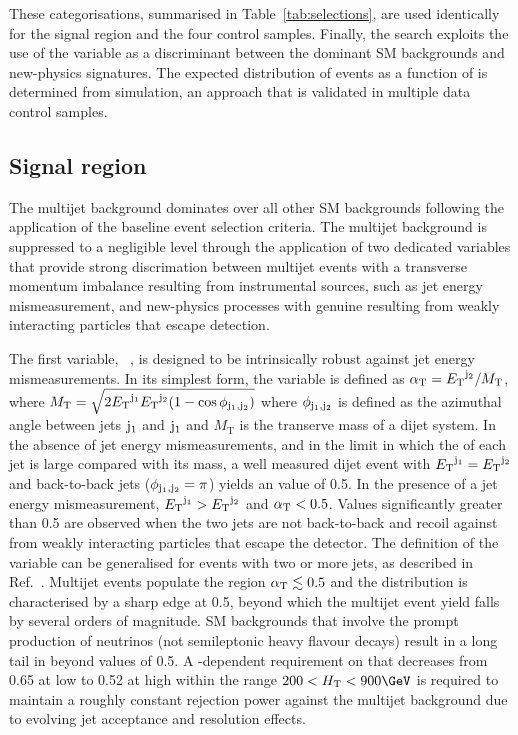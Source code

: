 These categorisations, summarised in
Table~\ref{tab:selections}, are used identically for the signal region
and the four control samples. Finally, the search exploits the use of
the \mht variable as a discriminant between the dominant SM
backgrounds and new-physics signatures. The expected distribution of
events as a function of \mht is determined from simulation, an
approach that is validated in multiple data control samples.

\subsection{Signal region}
\label{sec:signalregion}

The multijet background dominates over all other SM backgrounds
following the application of the baseline event selection
criteria. The multijet background is suppressed to a negligible level
through the application of two dedicated variables that provide strong
discrimation between multijet events with a transverse momentum
imbalance resulting from instrumental sources, such as jet energy
mismeasurement, and new-physics processes with genuine \ptvecmiss
resulting from weakly interacting particles that escape detection.

The first variable, \alphat~\cite{Randall:2008rw, RA1Paper}, is
designed to be intrinsically robust against jet energy
mismeasurements. In its simplest form, the \alphat variable is defined
as $\alpha_{\mathrm{T}} = {E_{\text T}}^{\rm j_2}/M_\text{T}$, where $M_\textrm{T} = \sqrt{
  2 {E_{\text T}}^{\rm j_1} {E_{\text T}}^{\rm j_2} (1 - \cos\phi_{\rm j_1,j_2})}$ where
$\phi_{\rm j_1,j_2}$ is defined as the azimuthal angle between jets
${\rm j_1}$ and ${\rm j_1}$ and $M_\textrm{T}$ is the transerve mass
of a dijet system. In the absence of jet energy mismeasurements, and
in the limit in which the \Et of each jet is large compared with its
mass, a well measured dijet event with ${E_{\text T}}^{\mathrm{j_1}} =
{E_{\text T}}^{\mathrm{j_2}}$ and back-to-back jets ($\phi_{\rm j_1,j_2} = \pi$)
yields an \alphat value of 0.5. In the presence of a jet energy
mismeasurement, ${E_{\text T}}^{\mathrm{j_1}} > {E_{\text T}}^{\mathrm{j_2}}$ and $\alpha_{\mathrm{T}}
< 0.5$. Values significantly greater than 0.5 are observed when the
two jets are not back-to-back and recoil against \ptvecmiss from
weakly interacting particles that escape the detector. The definition
of the \alphat variable can be generalised for events with two or more
jets, as described in Ref.~\cite{}. Multijet events populate the
region $\alpha_{\mathrm{T}} \lesssim 0.5$ and the \alphat distribution is
characterised by a sharp edge at 0.5, beyond which the multijet event
yield falls by several orders of magnitude. SM backgrounds that
involve the prompt production of neutrinos (\eg not semileptonic heavy
flavour decays) result in a long tail in \alphat beyond values of
0.5. A \scalht-dependent requirement on \alphat that decreases from
0.65 at low \scalht to 0.52 at high \scalht within the range $200 <
\scalht < 900\GeV$ is required to maintain a roughly constant
rejection power against the multijet background due to evolving jet
acceptance and resolution effects.

